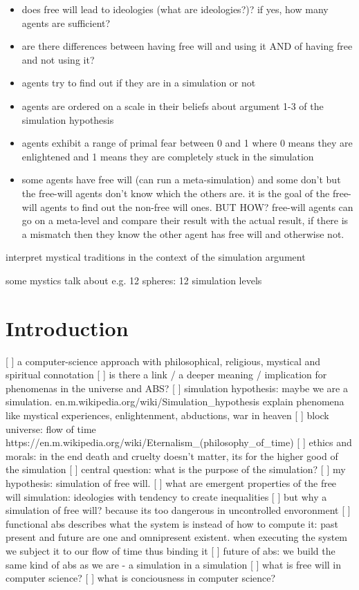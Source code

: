 \documentclass[twocolumn]{article}
\begin{document}
\begin{itemize}
	\item does free will lead to ideologies (what are ideologies?)? if yes, how many agents are sufficient?
	\item are there differences between having free will and using it AND of having free and not using it?
	\item agents try to find out if they are in a simulation or not
	\item agents are ordered on a scale in their beliefs about argument 1-3 of the simulation hypothesis 
	\item agents exhibit a range of primal fear between 0 and 1 where 0 means they are enlightened and 1 means they are completely stuck in the simulation
	\item some agents have free will (can run a meta-simulation) and some don't but the free-will agents don't know which the others are. it is the goal of the free-will agents to find out the non-free will ones. BUT HOW? free-will agents can go on a meta-level and compare their result with the actual result, if there is a mismatch then they know the other agent has free will and otherwise not.
\end{itemize}

interpret mystical traditions in the context of the simulation argument

some mystics talk about e.g. 12 spheres: 12 simulation levels

  
  
\section{Introduction}
[ ] a computer-science approach with philosophical, religious, mystical and spiritual connotation
[ ] is there a link / a deeper meaning / implication for phenomenas in the universe and ABS?
[ ] simulation hypothesis: maybe we are a simulation. en.m.wikipedia.org/wiki/Simulation_hypothesis explain phenomena like mystical experiences, enlightenment, abductions, war in heaven
[ ] block universe: flow of time https://en.m.wikipedia.org/wiki/Eternalism_(philosophy_of_time)
[ ] ethics and morals: in the end death and cruelty doesn't matter, its for the higher good of the simulation
[ ] central question: what is the purpose of the simulation?
[ ] my hypothesis: simulation of free will.
[ ] what are emergent properties of the free will simulation: ideologies with tendency to create inequalities
[ ] but why a simulation of free will? because its too dangerous in uncontrolled envoronment
[ ] functional abs describes what the system is instead of how to compute it: past present and future are one and omnipresent existent. when executing the system we subject it to our flow of time thus binding it
[ ] future of abs: we build the same kind of abs as we are - a simulation in a simulation 
[ ] what is free will in computer science?
[ ] what is conciousness in computer science?
\end{document}
